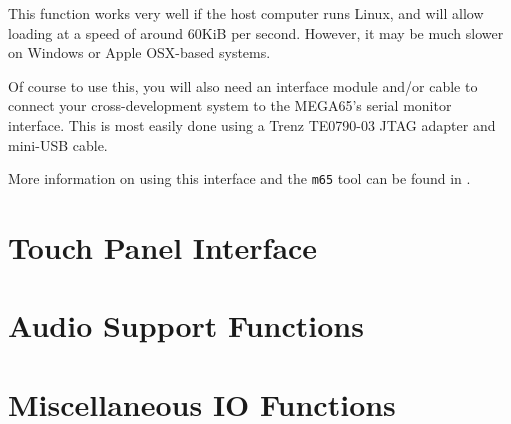 This function works very well if the host computer runs Linux, and
will allow loading at a speed of around 60KiB per second.  However, it
may be much slower on Windows or Apple OSX-based systems.

Of course to use this, you will also need an interface module and/or
cable to connect your cross-development system to the MEGA65's serial
monitor interface. This is most easily done using a Trenz TE0790-03
JTAG adapter and mini-USB cable.

More information on using this interface and the {\tt m65} tool can be
found in .

\section{Touch Panel Interface}

\section{Audio Support Functions}

\section{Miscellaneous IO Functions}

